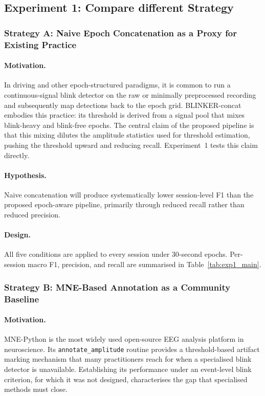 \subsection{Experiment 1: Compare different Strategy}
\subsubsection{Strategy A: Naive Epoch Concatenation as a Proxy for Existing Practice}
\label{sec:exp1}

\paragraph{Motivation.}
In driving and other epoch-structured paradigms, it is common to run a
continuous-signal blink detector on the raw or minimally preprocessed recording
and subsequently map detections back to the epoch grid.
BLINKER-concat embodies this practice: its threshold is derived from a signal
pool that mixes blink-heavy and blink-free epochs.
The central claim of the proposed pipeline is that this mixing dilutes the
amplitude statistics used for threshold estimation, pushing the threshold upward
and reducing recall.
Experiment~1 tests this claim directly.

\paragraph{Hypothesis.}
Naive concatenation will produce systematically lower session-level F1 than the
proposed epoch-aware pipeline, primarily through reduced recall rather than
reduced precision.

\paragraph{Design.}
All five conditions are applied to every session under 30-second epochs.
Per-session macro F1, precision, and recall are summarised in
Table~\ref{tab:exp1_main}.


\subsubsection{Strategy B: MNE-Based Annotation as a Community Baseline}
\label{sec:exp3}

\paragraph{Motivation.}
MNE-Python is the most widely used open-source EEG analysis platform in
neuroscience.
Its \texttt{annotate\_amplitude} routine provides a threshold-based artifact
marking mechanism that many practitioners reach for when a specialised blink
detector is unavailable.
Establishing its performance under an event-level blink criterion, for which it
was not designed, characterises the gap that specialised methods must close.

